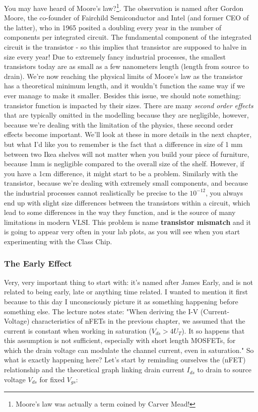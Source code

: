 You may have heard of Moore's law?\footnote{Moore's law was actually a term coined by Carver Mead!}. The observation is named after Gordon Moore, the co-founder of Fairchild Semiconductor and Intel (and former CEO of the latter), who in 1965 posited a doubling every year in the number of components per integrated circuit. The fundamental component of the integrated circuit is the transistor - so this implies that transistor are supposed to halve in size every year! Due to extremely fancy industrial processes, the smallest transistors today are as small as a few nanometers length (length from source to drain). We're now reaching the physical limits of Moore's law as the transistor has a theoretical minimum length, and it wouldn't function the same way if we ever manage to make it smaller. Besides this issue, we should note something: transistor function is impacted by their sizes. There are many \textit{second order effects} that are typically omitted in the modelling because they are negligible, however, because we're dealing with the limitation of the physics, these second order effects become important. We'll look at these in more details in the next chapter, but what I'd like you to remember is the fact that a difference in size of 1 mm between two Ikea shelves will not matter when you build your piece of furniture, because 1mm is negligible compared to the overall size of the shelf. However, if you have a 1cm difference, it might start to be a problem. Similarly with the transistor, because we're dealing with extremely small components, and because the industrial processes cannot realistically be precise to the $10^{-12}$, you always end up with slight size differences between the transistors within a circuit, which lead to some differences in the way they function, and is the source of many limitations in modern VLSI. This problem is name \textbf{transistor mismatch} and it is going to appear very often in your lab plots, as you will see when you start experimenting with the Class Chip.

\subsubsection{The Early Effect}

Very, very important thing to start with: it's named after James Early, and is not related to being early, late or anything time related. I wanted to mention it first because to this day I unconsciously picture it as something happening before something else. 
The lecture notes state: "When deriving the I-V (Current-Voltage) characteristics of nFETs in the previous chapter, we assumed that the current is constant when working in saturation ($V_{ds} > 4U_T$). It so happens that this assumption is not sufficient, especially with short length MOSFETs, for which the drain voltage can modulate the channel current, even in saturation." So what is exactly happening here?  
Let's start by reminding ourselves the (nFET) relationship and the theoretical graph linking drain current $I_{ds}$ to drain to source voltage $V_{ds}$ for fixed $V_{gs}$:

